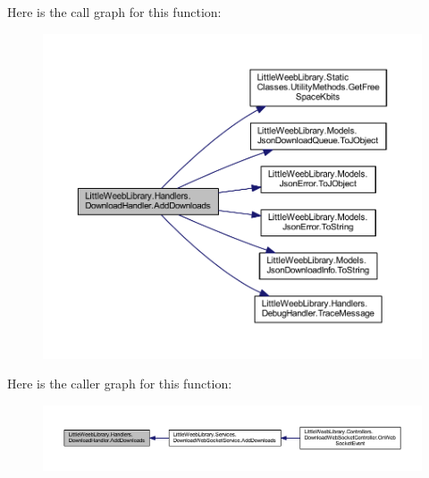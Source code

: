 Here is the call graph for this function\+:\nopagebreak
\begin{figure}[H]
\begin{center}
\leavevmode
\includegraphics[width=350pt]{class_little_weeb_library_1_1_handlers_1_1_download_handler_ac03f2dc024c0884bb7bd1c68ee03142e_cgraph}
\end{center}
\end{figure}
Here is the caller graph for this function\+:\nopagebreak
\begin{figure}[H]
\begin{center}
\leavevmode
\includegraphics[width=350pt]{class_little_weeb_library_1_1_handlers_1_1_download_handler_ac03f2dc024c0884bb7bd1c68ee03142e_icgraph}
\end{center}
\end{figure}
\mbox{\label{class_little_weeb_library_1_1_handlers_1_1_download_handler_ad673ec5fc987996b4793c41ce77aaad4}} 
